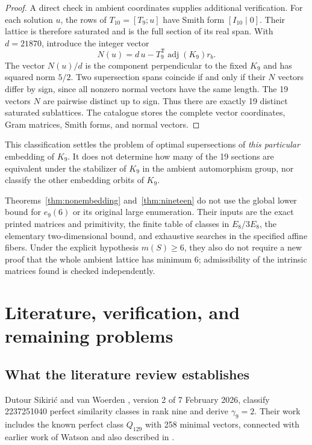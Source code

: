 \documentclass[11pt,a4paper]{article}
\theoremstyle{remark}\newtheorem{remark}[theorem]{Remark}
\begin{document}
\begin{proof}
A direct check in ambient coordinates supplies additional verification. For each solution $u$, the rows of $T_{10}=[T_9;u]$ have Smith form $[I_{10}\mid0]$. Their lattice is therefore saturated and is the full section of its real span. With $d=21870$, introduce the integer vector
\[
N(u)=d\,u-T_9^{\mathsf T}\operatorname{adj}(K_9)r_b.
\]
The vector $N(u)/d$ is the component perpendicular to the fixed $K_9$ and has squared norm $5/2$. Two supersection spans coincide if and only if their $N$ vectors differ by sign, since all nonzero normal vectors have the same length. The 19 vectors $N$ are pairwise distinct up to sign. Thus there are exactly 19 distinct saturated sublattices. The catalogue stores the complete vector coordinates, Gram matrices, Smith forms, and normal vectors.
\end{proof}

This classification settles the problem of optimal supersections of \emph{this particular} embedding of $K_9$. It does not determine how many of the 19 sections are equivalent under the stabilizer of $K_9$ in the ambient automorphism group, nor classify the other embedding orbits of $K_9$.

Theorems~\ref{thm:nonembedding} and~\ref{thm:nineteen} do not use the global lower bound for $e_9(6)$ or its original large enumeration. Their inputs are the exact printed matrices and primitivity, the finite table of classes in $E_8/3E_8$, the elementary two-dimensional bound, and exhaustive searches in the specified affine fibers. Under the explicit hypothesis $m(S)\ge6$, they also do not require a new proof that the whole ambient lattice has minimum 6; admissibility of the intrinsic matrices found is checked independently.

\section{Literature, verification, and remaining problems}

\subsection{What the literature review establishes}

Dutour Sikirić and van Woerden \cite{dw}, version 2 of 7 February 2026, classify 2237251040 perfect similarity classes in rank nine and derive $\gamma_9=2$. Their work includes the known perfect class $Q_{129}$ with 258 minimal vectors, connected with earlier work of Watson and also described in \cite{vwthesis}.
\end{document}
